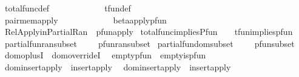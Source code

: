 \begin{isabellebody}
\isamarkupfalse%
\ total{\isacharunderscore}func{\isacharunderscore}def\ \ \ \ \ \ \ \ \ \ \ \ {\isacharequal}\ tfun{\isacharunderscore}def\ \ \isanewline
\isanewline
{}\isamarkupfalse%
\ pair{\isacharunderscore}mem{\isacharunderscore}apply\ \ \ \ \ \ \ \ \ \ \ \ {\isacharequal}\ beta{\isacharunderscore}apply{\isacharunderscore}pfun\ \isanewline
{}\isamarkupfalse%
\ Rel{\isacharunderscore}Apply{\isacharunderscore}in{\isacharunderscore}Partial{\isacharunderscore}Ran{}\ {\isacharequal}\ pfun{\isacharunderscore}apply\isanewline
{}\isamarkupfalse%
\ total{\isacharunderscore}func{\isacharunderscore}implies{\isacharunderscore}Pfun\ \ \ {\isacharequal}\ tfun{\isacharunderscore}implies{\isacharunderscore}pfun\isanewline
\isanewline
{}\isamarkupfalse%
\ partial{\isacharunderscore}fun{\isacharunderscore}ran{\isacharunderscore}subset\ \ \ \ {\isacharequal}\ pfun{\isacharunderscore}ran{\isacharunderscore}subset\isanewline
\isanewline
{}\isamarkupfalse%
\ partial{\isacharunderscore}fun{\isacharunderscore}dom{\isacharunderscore}subset\ \ \ \ {\isacharequal}\ pfun{\isacharunderscore}subset\isanewline
\isanewline
{}\isamarkupfalse%
\ dom{\isacharunderscore}oplus{\isacharunderscore}I\ {\isacharequal}\ dom{\isacharunderscore}override{\isacharunderscore}I\ \isanewline
\isanewline
{}\isamarkupfalse%
\ empty{\isacharunderscore}pfun\ {\isacharequal}\ empty{\isacharunderscore}is{\isacharunderscore}pfun\ \isanewline
\isanewline
{}\isamarkupfalse%
\ dom{\isacharunderscore}insert{\isacharunderscore}apply\ {\isacharequal}\ insert{\isacharunderscore}apply\ \isanewline
{}\isamarkupfalse%
\ dom{\isacharunderscore}insert{\isacharunderscore}apply{}\ {\isacharequal}\ insert{\isacharunderscore}apply{}\isanewline
\isanewline
\isanewline
\isanewline
%
\isadelimtheory
\isanewline
%
\endisadelimtheory
%
\isatagtheory
{}\isamarkupfalse%
%
\endisatagtheory
{\isafoldtheory}%
%
\isadelimtheory
\isanewline
%
\endisadelimtheory
\end{isabellebody}%
